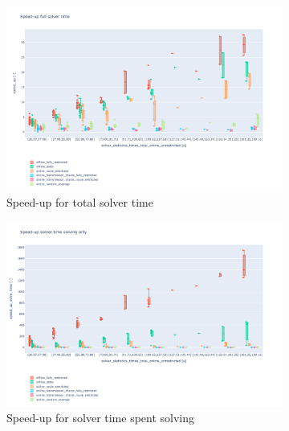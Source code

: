 \documentclass{article}
\begin{document}
\begin{figure}[hbtp]

     \begin{subfigure}{\textwidth}
        \includegraphics[width=\textwidth]{Figures/04_computational_results/speed_up_per_times_total_online_unrestricted.pdf}
        \caption{Speed-up for total solver time}
         \label{fig:computationtimes_speed_up_total}
    \end{subfigure}
     \begin{subfigure}{\textwidth}
        \includegraphics[width=\textwidth]{Figures/04_computational_results/speed_up_solve_time_per_times_total_online_unrestricted.pdf}
        \caption{Speed-up for solver time spent solving}
         \label{fig:computationtimes_speed_up_solve_time}
    \end{subfigure}
    \begin{subfigure}{\textwidth}

\end{subfigure}
\end{figure}
\end{document}
